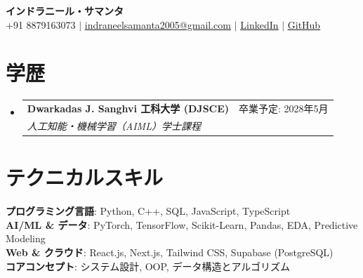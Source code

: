 \documentclass[letterpaper,11pt]{article}
\makeatletter
\newcommand{\resumeSubheading}[4]{
  \item
    \begin{tabular*}{0.97\textwidth}[t]{l@{\extracolsep{\fill}}r}
      \textbf{#1} & #2 \\[2pt]
      \textit{\small#3} & \textit{\small #4} \\
    \end{tabular*}\vspace{1pt}
}
\newcommand{\resumeSubHeadingListStart}{\begin{itemize}[leftmargin=0.15in, label={}, itemsep=5pt, parsep=0pt]}
\newcommand{\resumeSubHeadingListEnd}{\end{itemize}}
\makeatother
\begin{document}
\begin{center}
    \textbf{\Huge \scshape インドラニール・サマンタ} \\ \vspace{6pt}
    \small +91 8879163073 $|$ \href{mailto:indraneelsamanta2005@gmail.com}{\underline{indraneelsamanta2005@gmail.com}} $|$ 
    \href{https://linkedin.com/in/indraneel-samanta-724782347}{\underline{LinkedIn}} $|$
    \href{https://github.com/NotCatfish}{\underline{GitHub}}
\end{center}

\section{学歴}
  \resumeSubHeadingListStart
    \resumeSubheading
      {Dwarkadas J. Sanghvi 工科大学 (DJSCE)}{卒業予定: 2028年5月}
      {人工知能・機械学習（AIML）学士課程}{}
  \resumeSubHeadingListEnd

\section{テクニカルスキル}
 \begin{itemize}[leftmargin=0.15in, label={}]
    \small{\item{
     \textbf{プログラミング言語}{: Python, C++, SQL, JavaScript, TypeScript} \\[4pt]
     \textbf{AI/ML \& データ}{: PyTorch, TensorFlow, Scikit-Learn, Pandas, EDA, Predictive Modeling} \\[4pt]
     \textbf{Web \& クラウド}{: React.js, Next.js, Tailwind CSS, Supabase (PostgreSQL)} \\[4pt]
     \textbf{コアコンセプト}{: システム設計, OOP, データ構造とアルゴリズム}
    }}
 \end{itemize}

\end{document}
